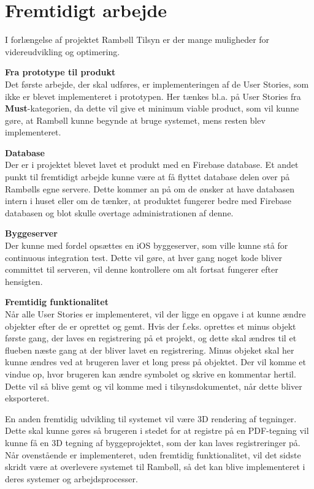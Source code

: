 \chapter{Fremtidigt arbejde}
I forlængelse af projektet Rambøll Tilsyn er der mange muligheder for videreudvikling og optimering.

\textbf{Fra prototype til produkt} \\
Det første arbejde, der skal udføres, er implementeringen af de User Stories, som ikke er blevet implementeret i prototypen. Her tænkes bl.a. på User Stories fra \textbf{Must}-kategorien, da dette vil give et minimum viable product, som vil kunne gøre, at Rambøll kunne begynde at bruge systemet, mens resten blev implementeret. 

\textbf{Database} \\
Der er i projektet blevet lavet et produkt med en Firebase database. Et andet punkt til fremtidigt arbejde kunne være at få flyttet database delen over på Rambølls egne servere. Dette kommer an på om de ønsker at have databasen intern i huset eller om de tænker, at produktet fungerer bedre med Firebase databasen og blot skulle overtage administrationen af denne. 

\textbf{Byggeserver} \\
Der kunne med fordel opsættes en iOS byggeserver, som ville kunne stå for continuous integration\cite{CI} test. Dette vil gøre, at hver gang noget kode bliver committet til serveren, vil denne kontrollere om alt fortsat fungerer efter hensigten.

\textbf{Fremtidig funktionalitet} \\
Når alle User Stories er implementeret, vil der ligge en opgave i at kunne ændre objekter efter de er oprettet og gemt. Hvis der f.eks. oprettes et minus objekt første gang, der laves en registrering på et projekt, og dette skal ændres til et flueben næste gang at der bliver lavet en registrering. Minus objeket skal her kunne ændres ved at brugeren laver et long press på objektet. Der vil komme et vindue op, hvor brugeren kan ændre symbolet og skrive en kommentar hertil. Dette vil så blive gemt og vil komme med i tilsynsdokumentet, når dette bliver eksporteret. 

En anden fremtidig udvikling til systemet vil være 3D rendering af tegninger. Dette skal kunne gøres så brugeren i stedet for at registre på en PDF-tegning vil kunne få en 3D tegning af byggeprojektet, som der kan laves registreringer på. \\

Når ovenstående er implementeret, uden fremtidig funktionalitet, vil det sidste skridt være at overlevere systemet til Rambøll, så det kan blive implementeret i deres systemer og arbejdsprocesser.